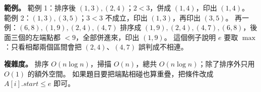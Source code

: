 \begin{pastsoln}
\textbf{範例。} 範例 1：排序後 $(1,3), (2,4)$；$2 < 3$，併成 $(1,4)$，印出 $(1,4)$。 範例 2：$(1,3),
(3,5)$；$3 < 3$ 不成立，印出 $(1,3)$，再印出 $(3,5)$。 再一例：$(6,8), (1,9), (2,4), (4,7)$ 排序成
$(1,9), (2,4), (4,7), (6,8)$，後面三個的左端點都 $< 9$，全部併進來，印出 $(1,9)$。 這個例子說明
$e$ 要取 $\max$：只看相鄰兩個區間會把 $(2,4)$、$(4,7)$ 誤判成不相連。

\textbf{複雜度。} 排序 $O(n \log n)$，掃描 $O(n)$，總共 $O(n \log n)$；除了排序外只用 $O(1)$ 的額外空間。
如果題目要把端點相碰也算重疊，把條件改成 $A[i].\mathit{start} \le e$ 即可。
\end{pastsoln}
